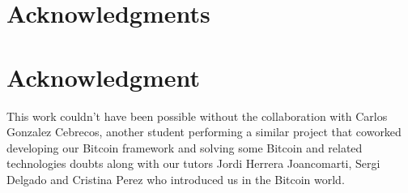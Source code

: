 \documentclass[12pt,journal,compsoc]{IEEEtran}
\begin{document}
%





\ifCLASSOPTIONcompsoc
  \section*{Acknowledgments}
\else
  \section*{Acknowledgment}
\fi


This work couldn't have been possible without the collaboration with Carlos Gonzalez Cebrecos, another student performing a similar project that coworked developing our Bitcoin framework and solving some Bitcoin and related technologies doubts along with our tutors Jordi Herrera Joancomarti, Sergi Delgado and Cristina Perez who introduced us in the Bitcoin world.


\ifCLASSOPTIONcaptionsoff
  \newpage
\fi
\end{document}

